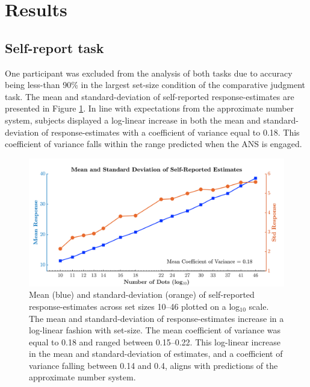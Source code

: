 \section{Results}
\subsection{Self-report task}
One participant was excluded from the analysis of both tasks due to accuracy being less-than 90\% in the largest set-size condition of the comparative judgment task. The mean and standard-deviation of self-reported response-estimates are presented in Figure \ref{fig:Ch2_ANScoefVar}. In line with expectations from the approximate number system, subjects displayed a log-linear increase in both the mean and standard-deviation of response-estimates with a coefficient of variance equal to 0.18. This coefficient of variance falls within the range predicted when the ANS is engaged.

\begin{figure}[htb]
\includegraphics[scale=.4]{Figures/Estimation/CoefVar.png}
\caption{Mean (blue) and standard-deviation (orange) of self-reported response-estimates across set sizes 10--46 plotted on a log$_{10}$ scale. The mean and standard-deviation of response-estimates increase in a log-linear fashion with set-size. The mean coefficient of variance was equal to 0.18 and ranged between 0.15--0.22. This log-linear increase in the mean and standard-deviation of estimates, and a coefficient of variance falling between 0.14 and 0.4, aligns with predictions of the approximate number system.}
\label{fig:Ch2_ANScoefVar}
\end{figure}


